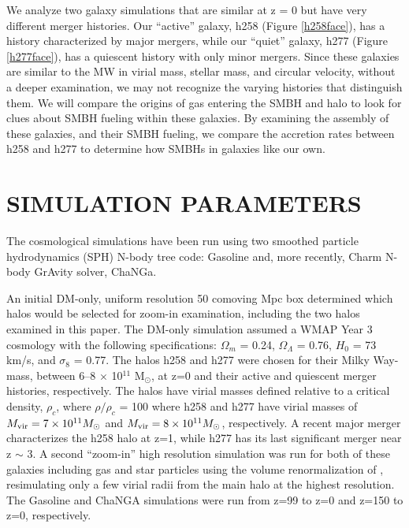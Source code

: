 \documentclass[12pt,headA,chapB]{fiskthesis}
\begin{document}
We analyze two galaxy simulations that are similar at z = 0 but have very different merger histories. Our ``active'' galaxy, h258 (Figure \ref{h258face}), has a history characterized by major mergers, while our ``quiet'' galaxy, h277 (Figure \ref{h277face}), has a quiescent history with only minor mergers. Since these galaxies are similar to the MW in virial mass, stellar mass, and circular velocity, without a deeper examination, we may not recognize the varying histories that distinguish them. We will compare the origins of gas entering the SMBH and halo to look for clues about SMBH fueling within these galaxies. By examining the assembly of these galaxies, and their SMBH fueling, we compare the accretion rates between h258 and h277 to determine how SMBHs in galaxies like our own.




\chapter{\normalsize SIMULATION PARAMETERS}
\thispagestyle{empty}

The cosmological simulations have been run using two smoothed particle hydrodynamics (SPH) N-body tree code: Gasoline \citep{Wadsley2004} and, more recently, Charm N-body GrAvity solver, ChaNGa. 

An initial DM-only, uniform resolution 50 comoving Mpc box determined which halos would be selected for zoom-in examination, including the two halos examined in this paper. The DM-only simulation assumed a WMAP Year 3 cosmology \citep{Spergel2007} with the following specifications: $\Omega _m$ = 0.24, $\Omega _{\Lambda}$ = 0.76, $H_0$ = 73 km/s, and $\sigma _8$ = 0.77. The halos h258 and h277  were chosen for their Milky Way-mass, between 6--8 $\times$ 10$^{11}$  M$_{\odot}$, at z=0 and their active and quiescent merger histories, respectively. The halos have virial masses defined relative to a critical density, $\rho _c$, where $\rho / \rho _c$ = 100 where h258 and h277 have virial masses of $M_{\rm vir} = 7 \times 10^{11} M_{\odot}$ and $M_{\rm vir} = 8 \times 10^{11} M_{\odot}$, respectively. A recent major merger characterizes the h258 halo at z=1, while h277 has its last significant merger near z $\sim$ 3. A second ``zoom-in'' high resolution simulation was run for both of these galaxies including gas and star particles using the volume renormalization of \cite{Katz1993}, resimulating only a few virial radii from the main halo at the highest resolution. The Gasoline and ChaNGA simulations were run from z=99 to z=0 and z=150 to z=0, respectively.  
\end{document}
